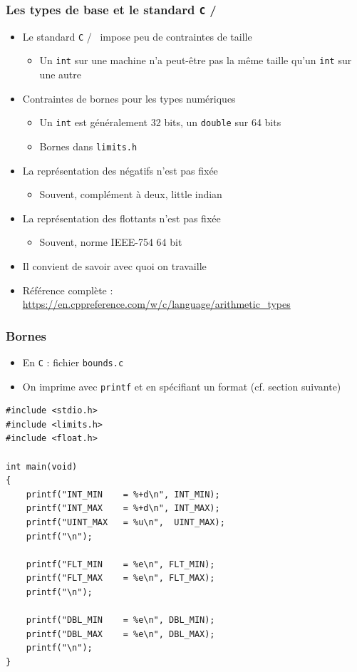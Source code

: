 \begin{frame}
\frametitle{Les types de base et le standard \texttt{C} /  \cpp}
\begin{itemize}[<+->]
\item Le standard \texttt{C} / \cpp\ impose peu de contraintes de taille
	\begin{itemize}
	\item Un \lstinline|int| sur une machine n'a peut-être pas la même taille qu'un \lstinline|int| sur une autre
	\end{itemize}
\item Contraintes de bornes pour les types numériques
	\begin{itemize}
	\item Un \lstinline|int| est généralement 32 bits, un \lstinline|double| sur 64 bits
	\item Bornes dans \texttt{limits.h}
	\end{itemize}
\item La représentation des négatifs n'est pas fixée
	\begin{itemize}
	\item Souvent, complément à deux, little indian
	\end{itemize}
\item La représentation des flottants n'est pas fixée
	\begin{itemize}
	\item Souvent, norme IEEE-754 64 bit
	\end{itemize}
\item Il convient de savoir avec quoi on travaille
\item Référence complète : \url{https://en.cppreference.com/w/c/language/arithmetic_types}
\end{itemize}
\end{frame}

\begin{frame}[containsverbatim]
\frametitle{Bornes}
\begin{itemize}
\item En \texttt{C} : fichier \texttt{bounds.c}
\item On imprime avec \texttt{printf} et en spécifiant un format (cf. section suivante)
\end{itemize}
\begin{lstlisting}
#include <stdio.h>
#include <limits.h>
#include <float.h>
 
int main(void)
{   
    printf("INT_MIN    = %+d\n", INT_MIN);
    printf("INT_MAX    = %+d\n", INT_MAX);
    printf("UINT_MAX   = %u\n",  UINT_MAX);
    printf("\n");
 
    printf("FLT_MIN    = %e\n", FLT_MIN);
    printf("FLT_MAX    = %e\n", FLT_MAX);
   	printf("\n");
   	
    printf("DBL_MIN    = %e\n", DBL_MIN);
    printf("DBL_MAX    = %e\n", DBL_MAX);
   	printf("\n");
}
\end{lstlisting}
\end{frame}

